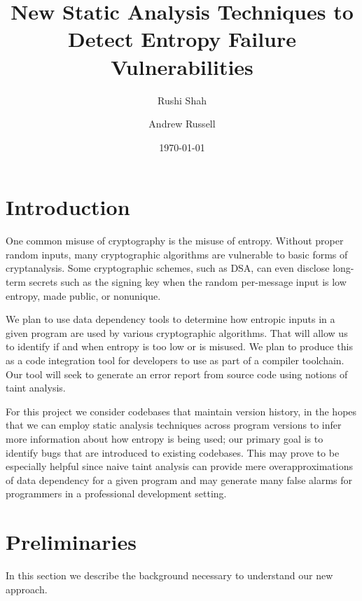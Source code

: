 \documentclass[letterpaper,twocolumn,10pt]{article}
\begin{document}
\date{\today}

\title{\Large \bf New Static Analysis Techniques to Detect Entropy Failure Vulnerabilities}

\author{
{\rm Rushi Shah}
\and
{\rm Andrew Russell}
}

\maketitle

\section{Introduction}

One common misuse of cryptography is the misuse of entropy. Without proper random inputs, many cryptographic algorithms
are vulnerable to basic forms of cryptanalysis. Some cryptographic schemes, such as DSA, can even disclose long-term secrets
such as the signing key when the random per-message input is low entropy, made public, or nonunique.

We plan to use data dependency tools to determine how entropic inputs in a given program are used by various cryptographic algorithms. That will allow us to identify if and when entropy is too low or is misused. We plan to produce this as a code integration tool for developers to use as part of a compiler toolchain.
Our tool will seek to generate an error report from source code using notions of taint analysis. 

For this project we consider codebases that maintain version history, in the hopes that we can employ static analysis techniques across program versions to infer more information about how entropy is being used; 
our primary goal is to identify bugs that are introduced to existing codebases. This may prove to be especially helpful since naive taint analysis can provide mere overapproximations of data dependency for a given program and may generate many false alarms for programmers in a professional development setting.

\section{Preliminaries}

In this section we describe the background necessary to understand our new approach.
\end{document}
